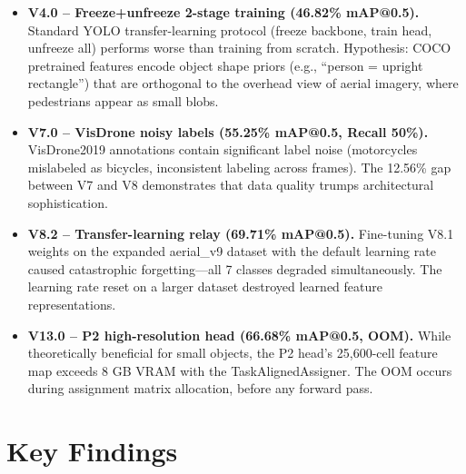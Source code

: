 \documentclass[11pt]{article}
\begin{document}
\begin{itemize}[leftmargin=*]
    \item \textbf{V4.0 -- Freeze+unfreeze 2-stage training (46.82\% mAP@0.5).}
          Standard YOLO transfer-learning protocol (freeze backbone, train head, unfreeze all)
          performs worse than training from scratch. Hypothesis: COCO pretrained features encode
          object shape priors (e.g., ``person = upright rectangle'') that are orthogonal to the
          overhead view of aerial imagery, where pedestrians appear as small blobs.
    \item \textbf{V7.0 -- VisDrone noisy labels (55.25\% mAP@0.5, Recall 50\%).}
          VisDrone2019 annotations contain significant label noise (motorcycles mislabeled as
          bicycles, inconsistent labeling across frames). The 12.56\% gap between V7 and V8
          demonstrates that data quality trumps architectural sophistication.
    \item \textbf{V8.2 -- Transfer-learning relay (69.71\% mAP@0.5).}
          Fine-tuning V8.1 weights on the expanded aerial\_v9 dataset with the default learning
          rate caused catastrophic forgetting—all 7 classes degraded simultaneously. The learning
          rate reset on a larger dataset destroyed learned feature representations.
    \item \textbf{V13.0 -- P2 high-resolution head (66.68\% mAP@0.5, OOM).}
          While theoretically beneficial for small objects, the P2 head's 25,600-cell feature
          map exceeds 8 GB VRAM with the TaskAlignedAssigner. The OOM occurs during assignment
          matrix allocation, before any forward pass.
\end{itemize}

\section{Key Findings}
\end{document}
